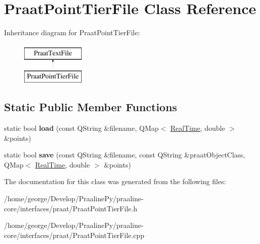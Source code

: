 \hypertarget{class_praat_point_tier_file}{}\section{Praat\+Point\+Tier\+File Class Reference}
\label{class_praat_point_tier_file}
Inheritance diagram for Praat\+Point\+Tier\+File\+:\begin{figure}[H]
\begin{center}
\leavevmode
\includegraphics[height=2.000000cm]{class_praat_point_tier_file}
\end{center}
\end{figure}
\subsection*{Static Public Member Functions}
\begin{DoxyCompactItemize}
\item 
\mbox{\label{class_praat_point_tier_file_a200eeb9c8862f7d8f504440af77682ce}} 
static bool {\bfseries load} (const Q\+String \&filename, Q\+Map$<$ \hyperlink{struct_real_time}{Real\+Time}, double $>$ \&points)
\item 
\mbox{\label{class_praat_point_tier_file_ae2106c943b775a6d96fbb6a425fa3433}} 
static bool {\bfseries save} (const Q\+String \&filename, const Q\+String \&praat\+Object\+Class, Q\+Map$<$ \hyperlink{struct_real_time}{Real\+Time}, double $>$ \&points)
\end{DoxyCompactItemize}


The documentation for this class was generated from the following files\+:\begin{DoxyCompactItemize}
\item 
/home/george/\+Develop/\+Praaline\+Py/praaline-\/core/interfaces/praat/Praat\+Point\+Tier\+File.\+h\item 
/home/george/\+Develop/\+Praaline\+Py/praaline-\/core/interfaces/praat/Praat\+Point\+Tier\+File.\+cpp\end{DoxyCompactItemize}

